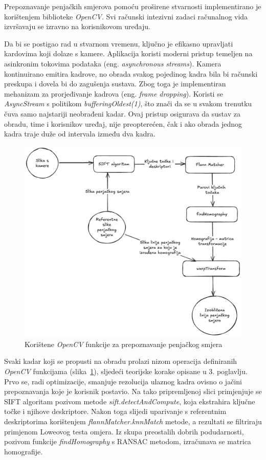 Prepoznavanje penjačkih smjerova pomoću proširene stvarnosti implementirano je korištenjem biblioteke \textit{OpenCV}. Svi računski intezivni zadaci računalnog vida izvršavaju se izravno na korisnikovom uređaju.

Da bi se postigao rad u stvarnom vremenu, ključno je efikasno upravljati kardovima koji dolaze s kamere. Aplikacija koristi moderni pristup temeljen na asinkronim tokovima podataka (eng. \textit{asynchronous streams}). Kamera kontinuirano emitira kadrove, no obrada svakog pojedinog kadra bila bi računski preskupa i dovela bi do zagušenja sustava. Zbog toga je implementiran mehanizam za prorjeđivanje kadrova (eng. \textit{frame dropping}). 
Koristi se \textit{AsyncStream} s politikom \textit{bufferingOldest(1)}, što znači da se u svakom trenutku čuva samo najstariji neobrađeni kadar. Ovaj pristup osigurava da sustav za obradu, time i korisnikov uređaj, nije preopterećen, čak i ako obrada jednog kadra traje duže od intervala između dva kadra.

\begin{figure}[H]
    \centering
    \includegraphics[width=1.0\textwidth]{images/arhitektura/cv_arch.png}
    \caption{Korištene \textit{OpenCV} funkcije za prepoznavanje penjačkog smjera}
    \label{fig:cv_arch}
\end{figure}

Svaki kadar koji se propusti na obradu prolazi nizom operacija definiranih \textit{OpenCV} funkcijama (slika~\ref{fig:cv_arch}), sljedeći teorijske korake opisane u 3. poglavlju. Prvo se, radi optimizacije, smanjuje rezolucija ulaznog kadra ovisno o jačini prepoznavanja koje je korisnik postavio. Na tako pripremljenoj slici primjenjuje se SIFT algoritam pozivom metode \textit{sift.detectAndCompute}, koja ekstrahira ključne točke i njihove deskriptore. 
Nakon toga slijedi uparivanje s referentnim deskriptorima korištenjem \textit{flannMatcher.knnMatch} metode, a rezultati se filtriraju primjenom Loweovog testa omjera. Iz skupa preostalih dobrih podudarnosti, pozivom funkcije \textit{findHomography} s RANSAC metodom, izračunava se matrica homografije.


